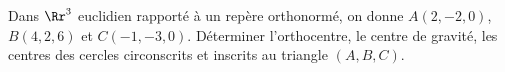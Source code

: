 {{Dans $\Rr^3$ euclidien rapporté à un repère orthonormé, on donne $A(2,-2,0)$, $B(4,2,6)$ et 
$C(-1,-3,0)$. Déterminer l'orthocentre, le centre de gravité, les centres des cercles circonscrits et inscrits au triangle $(A,B,C)$.
\begin{center}
\end{center}
}
}
